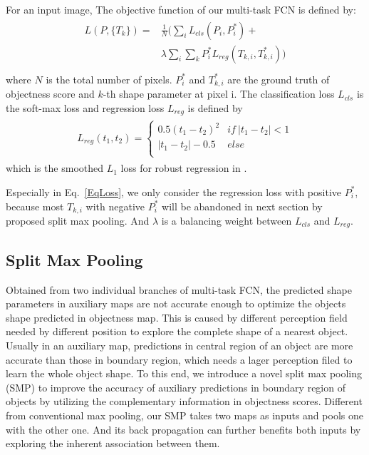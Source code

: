 For an input image, The objective function of our multi-task FCN is defined by:
\begin{eqnarray}\label{EqLoss}
\begin{aligned}
L(P,\{T_k\}) =& \frac{1}{N}(\sum_{i}L_{cls}(P_i,P^*_{i})+\\
&\lambda\sum_{i}\sum_{k}P^*_{i}L_{reg}(T_{k,i},T^*_{k,i}))\\
\end{aligned}
\end{eqnarray}
where $N$ is the total number of pixels.
$P^*_i$ and $T^*_{k,i}$ are the ground truth of objectness score and $k$-th shape parameter at pixel i.
The classification loss $L_{cls}$ is the soft-max loss and regression loss $L_{reg}$ is defined by
\begin{eqnarray}
\label{EqSmoothL1}
\begin{aligned}
L_{reg}(t_1,t_2) =\left\{\begin{array}{cc}
0.5(t_1-t_2)^2&if~|t_1-t_2|<1\\
|t_1-t_2|-0.5&else\\
\end{array}\right.
\end{aligned}
\end{eqnarray}
which is the smoothed $L_1$ loss for robust regression in \cite{Ren2015}.

Especially in Eq.~\ref{EqLoss}, we only consider the regression loss with positive $P^*_i$, because most $T_{k,i}$ with negative $P^*_i$ will be abandoned in next section by proposed split max pooling.
And $\lambda$ is a balancing weight between $L_{cls}$ and $L_{reg}$.

\subsection{Split Max Pooling}
\label{sec:split-max-pooling}

Obtained from two individual branches of multi-task FCN, the predicted shape parameters in auxiliary maps are not accurate enough to optimize the objects shape predicted in objectness map.
This is caused by different perception field needed by different position to explore the complete shape of a nearest object.
Usually in an auxiliary map, predictions in central region of an object are more accurate than those in boundary region, which needs a lager perception filed to learn the whole object shape.
To this end, we introduce a novel split max pooling (SMP) to improve the accuracy of auxiliary predictions in boundary region of objects by utilizing the complementary information in objectness scores.
Different from conventional max pooling, our SMP takes two maps as inputs and pools one with the other one.
And its back propagation can further benefits both inputs by exploring the inherent association between them.

